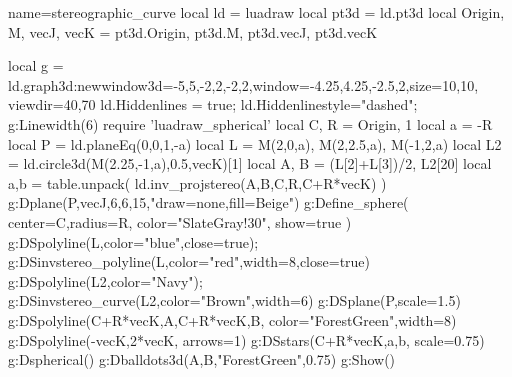 \begin{luadraw}{name=stereographic_curve}
local ld = luadraw
local pt3d = ld.pt3d
local Origin, M, vecJ, vecK = pt3d.Origin, pt3d.M, pt3d.vecJ, pt3d.vecK

local g = ld.graph3d:new{window3d={-5,5,-2,2,-2,2},window={-4.25,4.25,-2.5,2},size={10,10}, viewdir={40,70}}
ld.Hiddenlines = true; ld.Hiddenlinestyle="dashed"; g:Linewidth(6)
require 'luadraw_spherical'
local C, R = Origin, 1
local a = -R
local P = ld.planeEq(0,0,1,-a)
local L = {M(2,0,a), M(2,2.5,a), M(-1,2,a)}
local L2 = ld.circle3d(M(2.25,-1,a),0.5,vecK)[1]
local A, B = (L[2]+L[3])/2, L2[20]
local a,b = table.unpack( ld.inv_projstereo({A,B},{C,R},C+R*vecK) )
g:Dplane(P,vecJ,6,6,15,"draw=none,fill=Beige")
g:Define_sphere( {center=C,radius=R, color="SlateGray!30", show=true} )
g:DSpolyline(L,{color="blue",close=true}); g:DSinvstereo_polyline(L,{color="red",width=8,close=true})
g:DSpolyline(L2,{color="Navy"}); g:DSinvstereo_curve(L2,{color="Brown",width=6})
g:DSplane(P,{scale=1.5})
g:DSpolyline({{C+R*vecK,A},{C+R*vecK,B}}, {color="ForestGreen",width=8})
g:DSpolyline({{-vecK,2*vecK}}, {arrows=1})
g:DSstars({C+R*vecK,a,b}, {scale=0.75})
g:Dspherical()
g:Dballdots3d({A,B},"ForestGreen",0.75)
g:Show()
\end{luadraw}
